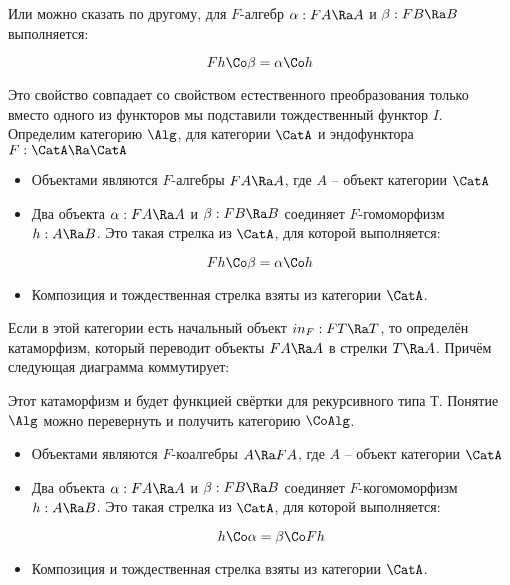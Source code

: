 Или можно сказать по другому, для $F$-алгебр $\alpha:FA \Ra A$ и
$\beta : FB \Ra B$ выполняется:

\[Fh \Co \beta = \alpha \Co h\]

Это свойство совпадает со свойством естественного преобразования только
вместо одного из функторов мы подставили тождественный функтор $I$.
Определим категорию $\Alg$, для категории $\CatA$ и эндофунктора
$F : \CatA \Ra \CatA$

\begin{itemize}
\item
  Объектами являются $F$-алгебры $FA \Ra A$, где $A$ -- объект категории
  $\CatA$
\item
  Два объекта $\alpha : FA \Ra A$ и $\beta : FB \Ra B$ соединяет
  $F$-гомоморфизм $h : A \Ra B$. Это такая стрелка из $\CatA$, для
  которой выполняется:
\end{itemize}

\[Fh \Co \beta = \alpha \Co h\]

\begin{itemize}
\item
  Композиция и тождественная стрелка взяты из категории $\CatA$.
\end{itemize}

Если в этой категории есть начальный объект $in_F : FT \Ra T$, то
определён катаморфизм, который переводит объекты $FA \Ra A$ в стрелки
$T \Ra A$. Причём следующая диаграмма коммутирует:

\begin{centering}



\end{centering}

Этот катаморфизм и будет функцией свёртки для рекурсивного типа $Т$.
Понятие $\Alg$ можно перевернуть и получить категорию $\CoAlg$.

\begin{itemize}
\item
  Объектами являются $F$-коалгебры $A \Ra FA$, где $A$ -- объект
  категории $\CatA$
\item
  Два объекта $\alpha : FA \Ra A$ и $\beta : FB \Ra B$ соединяет
  $F$-когомоморфизм \mbox{$h : A \Ra B$}. Это такая стрелка из $\CatA$,
  для которой выполняется:

  \[h \Co \alpha = \beta \Co Fh\]
\item
  Композиция и тождественная стрелка взяты из категории $\CatA$.
\end{itemize}

